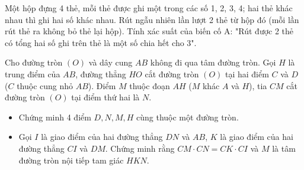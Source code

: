 \begin{ex}
	Một hộp đựng 4 thẻ, mỗi thẻ được ghi một trong các số 1, 2, 3, 4; hai thẻ khác nhau thì ghi hai số khác nhau. Rút ngẫu nhiên lần lượt 2 thẻ từ hộp đó (mỗi lần rút thẻ ra không bỏ thẻ lại hộp). Tính xác suất của biến cố A: "Rút được 2 thẻ có tổng hai số ghi trên thẻ là một số chia hết cho 3".
\end{ex}

\begin{ex}
	Cho đường tròn $(O)$ và dây cung $AB$ không đi qua tâm đường tròn. Gọi $H$ là trung điểm của $AB$, đường thẳng $HO$ cắt đường tròn $(O)$ tại hai điểm $C$ và $D$ ($C$ thuộc cung nhỏ $AB$). Điểm $M$ thuộc đoạn $AH$ ($M$ khác $A$ và $H$), tia $CM$ cắt đường tròn $(O)$ tại điểm thứ hai là $N$.
	\begin{itemize}
		\item[a)] Chứng minh 4 điểm $D, N, M, H$ cùng thuộc một đường tròn.
		\item[b)] Gọi $I$ là giao điểm của hai đường thẳng $DN$ và $AB$, $K$ là giao điểm của hai đường thẳng $CI$ và $DM$. Chứng minh rằng $CM \cdot CN = CK \cdot CI$ và $M$ là tâm đường tròn nội tiếp tam giác $HKN$.
	\end{itemize}
	\loigiai{
	}
		
\end{ex}

